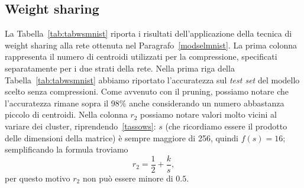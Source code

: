 \documentclass[11pt,a4paper,twoside,
openright]{book}
\begin{document}
\subsection{Weight sharing}
La Tabella~\ref{tab:tabwsmnist} riporta i risultati dell'applicazione della tecnica di weight sharing alla rete ottenuta nel Paragrafo~\ref{modselmnist}. La prima colonna rappresenta il numero di centroidi utilizzati per la compressione, specificati separatamente per i due strati della rete. Nella prima riga della Tabella~\ref{tab:tabwsmnist} abbiamo riportato l'accuratezza sul \textit{test set} del modello scelto senza compressioni. Come avvenuto con il pruning, possiamo notare che l'accuratezza rimane sopra il 98\% anche considerando un numero abbastanza piccolo di centroidi.
Nella colonna $r_2$ possiamo notare valori molto vicini al variare dei cluster, riprendendo~\eqref{tassows}: $s$ (che ricordiamo essere il prodotto delle dimensioni della matrice) è sempre maggiore di 256, quindi $f(s)=16$; semplificando la formula troviamo $$\displaystyle{r_2=\frac{1}{2}+\frac{k}{s}},$$ per questo motivo $r_2$ non può essere minore di $0.5$.
\vspace*{\fill}
\end{document}
